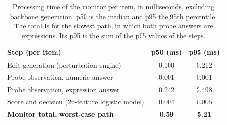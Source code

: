 \begin{table}[t]
\small\setlength{\tabcolsep}{3pt}
\caption{Processing time of the monitor per item, in milliseconds, excluding backbone generation. p50 is the median and p95 the 95th percentile. The total is for the slowest path, in which both probe answers are expressions. Its p95 is the sum of the p95 values of the steps.\label{tab:overhead}}
\begin{tabularx}{\textwidth}{lCC}
\toprule
\textbf{Step (per item)} & \textbf{p50 (ms)} & \textbf{p95 (ms)} \\
\midrule
Edit generation (perturbation engine) & 0.100 & 0.212 \\
Probe observation, numeric answer & 0.001 & 0.001 \\
Probe observation, expression answer & 0.242 & 2.498 \\
Score and decision (26-feature logistic model) & 0.004 & 0.005 \\
\midrule
\textbf{Monitor total, worst-case path} & \textbf{0.59} & \textbf{5.21} \\
\bottomrule
\end{tabularx}
\end{table}
